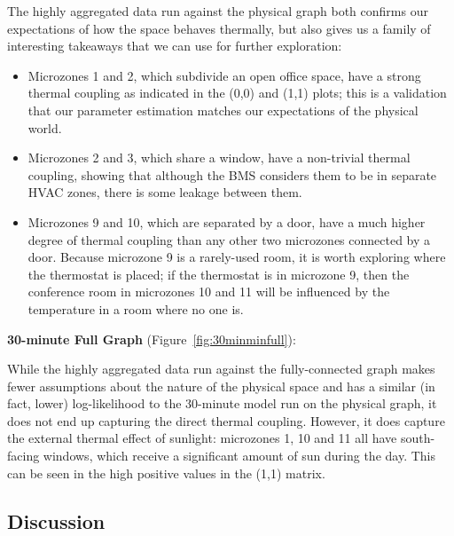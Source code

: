 The highly aggregated data run against the physical graph both confirms our expectations of how the space behaves thermally, but also gives us a family of interesting takeaways that we can use for further exploration:

\begin{itemize}[noitemsep,nolistsep]
\item Microzones 1 and 2, which subdivide an open office space, have a strong thermal coupling as indicated in the (0,0) and (1,1) plots; this is a validation that our parameter estimation matches our expectations of the physical world.
\item Microzones 2 and 3, which share a window, have a non-trivial thermal coupling, showing that although the BMS considers them to be in separate HVAC zones, there is some leakage between them.
\item Microzones 9 and 10, which are separated by a door, have a much higher degree of thermal coupling than any other two microzones connected by a door.
Because microzone 9 is a rarely-used room, it is worth exploring where the thermostat is placed; if the thermostat is in microzone 9, then the conference room in microzones 10 and 11 will be influenced by the temperature in a room where no one is.
\end{itemize}

\textbf{30-minute Full Graph} (Figure~\ref{fig:30minminfull}):

While the highly aggregated data run against the fully-connected graph makes fewer assumptions about the nature of the physical space and has a similar (in fact, lower) log-likelihood to the 30-minute model run on the physical graph, it does not end up capturing the direct thermal coupling.
However, it does capture the external thermal effect of sunlight: microzones 1, 10 and 11 all have south-facing windows, which receive a significant amount of sun during the day.
This can be seen in the high positive values in the (1,1) matrix.

\subsection{Discussion}

